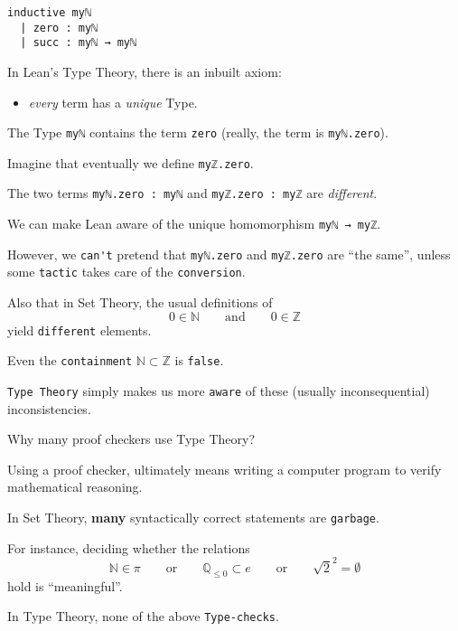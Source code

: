 \documentclass{beamer}
\begin{document}
\begin{frame}[fragile]

\begin{verbatim}
inductive myℕ
  | zero : myℕ
  | succ : myℕ → myℕ
\end{verbatim}

In Lean's Type Theory, there is an inbuilt axiom:

\vspace{-13pt}
\begin{itemize}
\setlength\itemsep{-12pt}
\item
  {\emph{every}} term has a {\emph{unique}} Type.
\end{itemize}

The Type {\color{violet}\verb`myℕ`} contains the term {\color{violet}\verb`zero`} (really, the term is {\color{violet}\verb`myℕ.zero`}).

Imagine that eventually we define {\color{violet}\verb`myℤ.zero`}.

The two terms {\color{violet}\verb`myℕ.zero : myℕ`} and {\color{violet}\verb`myℤ.zero : myℤ`} are {\emph{different}}.
\end{frame}

\begin{frame}[fragile]

We can make Lean aware of the unique homomorphism {\color{violet}\verb`myℕ → myℤ`}.

However, we {\color{violet}\verb`can't`} pretend that {\color{violet}\verb`myℕ.zero`} and {\color{violet}\verb`myℤ.zero`} are ``the same'', unless some {\color{violet}\verb`tactic`} takes care of the {\color{violet}\verb`conversion`}.

Also that in Set Theory, the usual definitions of
$$
  0 \in \mathbb{N} \qquad {\textrm{and}} \qquad 0 \in \mathbb{Z}
$$
yield {\color{violet}\verb`different`} elements.

Even the {\color{violet}\verb`containment`} $\mathbb{N} \subset \mathbb{Z}$ is {\color{violet}\verb`false`}.

{\color{violet}\verb`Type Theory`} simply makes us more {\color{violet}\verb`aware`} of these (usually inconsequential) inconsistencies.
\end{frame}

\begin{frame}[fragile]{Why many proof checkers use Type Theory?}

Using a proof checker, ultimately means writing a computer program to verify mathematical reasoning.

In Set Theory, {\textbf{many}} syntactically correct statements are {\color{violet}\verb`garbage`}.

For instance, deciding whether the relations
$$
  \mathbb{N} \in \pi
  \qquad {\textrm{or}} \qquad
  \mathbb{Q}_{\le 0} \subset e
  \qquad {\textrm{or}} \qquad
  \sqrt{2} ^ 2 = \emptyset
$$
hold is ``meaningful''.

In Type Theory, none of the above {\color{violet}\verb`Type-checks`}.
\end{frame}
\end{document}
